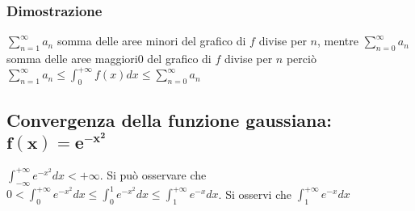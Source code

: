 \subsubsection{Dimostrazione}
$\sum\limits_{n=1}^\infty a_n$ somma delle aree minori del grafico di $f$ divise per $n$, mentre $\sum\limits_{n=0}^\infty a_n$ somma delle aree maggiori0 del grafico di $f$ 
divise per $n$ perci\`o $\sum\limits_{n=1}^\infty a_n\le\int_0^{+\infty}f(x)dx\le \sum\limits_{n=0}^\infty a_n$
\subsection{Convergenza della funzione gaussiana: $\mathbf{f(x)=e^{-x^2}}$}
$\int_{-\infty}^{+\infty}e^{-x^2}dx<+\infty$. Si pu\`o osservare che $0<\int_0^{+\infty}e^{-x^2}dx\le \int_0^1e^{-x^2}dx\le\int_1^{+\infty}e^{-x}dx$. Si osservi che $\int_1^{+
\infty}e^{-x}dx$%